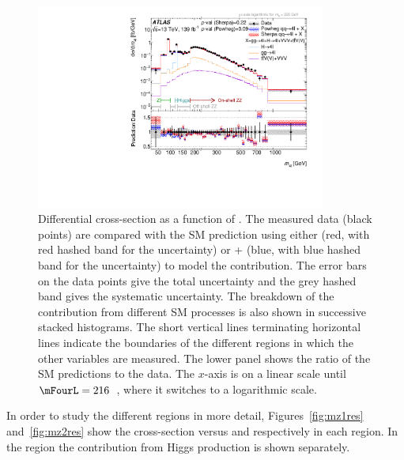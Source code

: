 \begin{figure}[tb]
  \centering
  \includegraphics[width = 0.85\textwidth]{Figures/m4l/UnfoldedResults/linlog_Unfolded_Data_inclm4l.pdf} 
    \caption{Differential cross-section as a function of \mFourL. The measured data
  (black points)  are compared with the SM
  prediction using either \SHERPA{} (red, with red hashed
  band for the uncertainty) or \POWHEG{} + \pythia{} (blue,
  with blue hashed band for the uncertainty) to model the \qqFourL{} contribution. The error bars on the data points give the total uncertainty
  and the grey hashed band gives the systematic uncertainty. The
  breakdown of the contribution from different SM processes is also
  shown in successive stacked histograms.
  The short vertical lines terminating horizontal lines indicate the boundaries of the different
  \mFourL{} regions in which the other variables are measured.
  \Pvalue{}
  The
  lower panel shows the ratio of the SM predictions to the 
  data. The $x$-axis is on a linear scale until $\mFourL = 216$~\GeV,
  where it switches to a logarithmic scale. \label{fig:cross-sec-m4l}}
\end{figure}
In order to study the different \mFourL{} regions in more detail,  Figures~\ref{fig:mz1res} and~\ref{fig:mz2res} 
show the cross-section versus 
\mZOne{} and \mZTwo{} respectively in each region.
In the \HFourL{} region the contribution from Higgs production is
shown separately.

